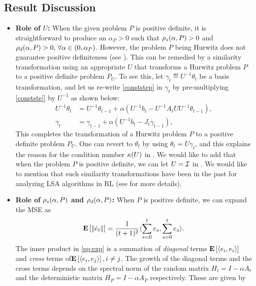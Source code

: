 \subsection{Result Discussion}
\begin{itemize}[leftmargin=*, before = \leavevmode\vspace{-\baselineskip}]
\item \textbf{Role of $U$:} When the given problem $P$ is positive definite, it is straightforward to produce an $\alpha_P>0$ such that $\rho_s(\alpha,P)>0$ and $\rho_d(\alpha,P)>0,\,\forall \alpha\in(0,\alpha_P)$. However, the problem $P$ being Hurwitz does not guarantee positive definiteness (see ). This can be remedied by a similarity transformation using an appropriate $U$ that transforms a Hurwitz problem $P$ to a positive definite problem $P_U$. To see this, let $\gamma_t\eqdef U^{-1 }\theta_t$ be a basis transformation, and let us re-write \eqref{conststep} in $\gamma_t$ by pre-multiplying \eqref{constste[} by $U^{-1}$ as shown below:
\begin{align*}
U^{-1}\theta_t&=U^{-1}\theta_{t-1}+\alpha(U^{-1} b_t- U^{-1}A_t U U^{-1}\theta_{t-1}),\\
\gamma_t&=\gamma_{t-1}+\alpha(U^{-1} b_t- J_t\gamma_{t-1}),
\end{align*}
This completes the transformation of a Hurwitz problem $P$ to a positive definite problem $P_U$. One can revert to $\theta_t$ by using $\theta_t=U\gamma_t$, and this explains the reason for the condition number $\kappa(U)$ in . We would like to add that when the problem $P$ is positive definite, we can let $U=\mathcal{I}$ in . We would like to mention that such similarity transformations have been in the past for analyzing LSA algorithms in RL \cite{lihong} (see  for more details).
\item \textbf{Role of $\rho_s(\alpha,P)$ and $\rho_d(\alpha,P)$:} When $P$ is positive definite, we can expand the MSE as \begin{align}\label{eq:exp}\mathbf{E}\left[\left\| \hat{e}_t\right\|\right]=\frac{1}{(t+1)^2}\langle\sum_{s=0}^t e_s,\sum_{s=0}^t e_s\rangle.\end{align} The inner product in \eqref{eq:exp} is a summation of \emph{diagonal} terms $\mathbf{E}\left[\langle e_i,e_i\rangle\right]$ and \emph{cross} terms of$\mathbf{E}\left[\langle e_i,e_j\rangle\right],i\neq j$. The growth of the diagonal terms and the cross terms depends on the spectral norm of the random matrix $H_t=I-\alpha A_t$ and the deterministic matrix $H_P=I-\alpha A_P$ respectively. These are given by
\begin{comment}

\end{comment}
\end{itemize}
